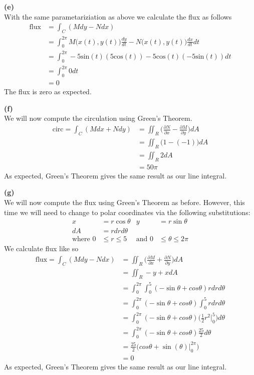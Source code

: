 \documentclass[12pt]{article}
\newcommand{\problem}[1]{\hspace{-4 ex} \large \textbf{#1}\\}
\begin{document}
\problem{(e)}
	With the same parametariziation as above we calculate the flux as follows
	\begin{align*}
		\text{flux} & = \int_{C}(Mdy - Ndx) \\
		& = \int_{0}^{2\pi} M\big(x(t),y(t)\big)\tfrac{dy}{dt} - N\big(x(t),y(t)\big) \tfrac{dx}{dt} dt \\
		& = \int_{0}^{2\pi} -5 \text{sin}(t)(5\text{cos}(t)) - 5\text{cos}(t)(-5\text{sin}(t)) dt \\
		& = \int_{0}^{2\pi} 0 dt \\
		& = 0
	\end{align*}
	The flux is zero as expected.
	
\problem{(f)}
	We will now compute the circulation using Green's Theorem.
	\begin{align*}
		\text{circ} = \int_{C}(Mdx + Ndy) & = \iint_{R}\Big(\frac{\partial N}{\partial x} - \frac{\partial M}{\partial y}\Big) dA \\
		& = \iint_{R}\big(1 - (-1)\big) dA \\
		& = \iint_{R}2 dA \\
		& = 50 \pi
	\end{align*}
	As expected, Green's Theorem gives the same result as our line integral.
	
\problem{(g)}
	We will now compute the flux using Green's Theorem as before. However, this time we will need to change to polar coordinates via the following substitutions: \bigbreak
	\begin{align*}
		x &= r\cos \theta & y &= r\sin \theta \\
		dA &= r dr d\theta&& \\
		\text{where } 0 & \leq r \leq 5 & \text{and } 0 &\leq \theta \leq 2\pi
	\end{align*} \bigbreak
	We calculate flux like so
	\begin{align*}
		\text{flux} = \int_{C}(Mdy - Ndx) & = \iint_{R}\Big(\frac{\partial M}{\partial x} + \frac{\partial N}{\partial y}\Big) dA \\
		& = \iint_{R}-y + x dA \\
		& = \int_{0}^{2\pi} \int_{0}^{5} (-\sin \theta + cos \theta) r dr d\theta \\
		& = \int_{0}^{2\pi} (-\sin \theta + cos \theta)\int_{0}^{5} r dr d\theta \\
		& = \int_{0}^{2\pi} (-\sin \theta + cos \theta)\Bigg( \tfrac{1}{2}r^2 \Big\vert_{0}^{5}\Bigg) d\theta \\
		& = \int_{0}^{2\pi} (-\sin \theta + cos \theta)\tfrac{25}{2} d\theta \\
		& = \tfrac{25}{2} \Bigg( cos \theta + \sin(\theta)\Big\vert_{0}^{2\pi}\Bigg) \\
		& = 0
	\end{align*}
	As expected, Green's Theorem gives the same result as our line integral.
	
\end{document}
